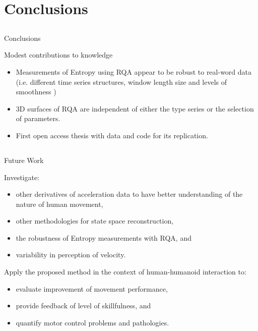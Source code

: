 \section{Conclusions}

\subsection{}
{
\begin{frame}{Conclusions}

Modest contributions to knowledge
\begin{itemize}
	\item Measurements of Entropy using RQA appear
	to be robust to real-word data (i.e. different time series
	structures, window length size and levels of smoothness )
	\item 3D surfaces of RQA are independent of either
	the type series or the selection of parameters.
	\item First open access thesis with data and code 
	for its replication. 
\end{itemize}

\end{frame}
}

\subsection{}
{

\begin{frame}{Future Work}

Investigate:
\begin{itemize}
	\item other derivatives of acceleration data
	to have better understanding of the nature of human movement,
	\item other methodologies for state space reconstruction,
	\item the robustness of Entropy measurements with RQA, and 
	\item variability in perception of velocity.
\end{itemize}

Apply the proposed method in the context of human-humanoid interaction to:
\begin{itemize}
	\item evaluate improvement of movement performance,
	\item provide feedback of level of skillfulness, and 
	\item quantify motor control problems and pathologies.
\end{itemize}


\end{frame}
}



